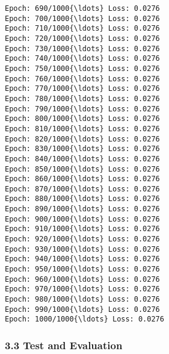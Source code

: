\documentclass[11pt]{article}
\begin{document}
\begin{Verbatim}[commandchars=\\\{\}]
Epoch: 690/1000{\ldots} Loss: 0.0276
Epoch: 700/1000{\ldots} Loss: 0.0276
Epoch: 710/1000{\ldots} Loss: 0.0276
Epoch: 720/1000{\ldots} Loss: 0.0276
Epoch: 730/1000{\ldots} Loss: 0.0276
Epoch: 740/1000{\ldots} Loss: 0.0276
Epoch: 750/1000{\ldots} Loss: 0.0276
Epoch: 760/1000{\ldots} Loss: 0.0276
Epoch: 770/1000{\ldots} Loss: 0.0276
Epoch: 780/1000{\ldots} Loss: 0.0276
Epoch: 790/1000{\ldots} Loss: 0.0276
Epoch: 800/1000{\ldots} Loss: 0.0276
Epoch: 810/1000{\ldots} Loss: 0.0276
Epoch: 820/1000{\ldots} Loss: 0.0276
Epoch: 830/1000{\ldots} Loss: 0.0276
Epoch: 840/1000{\ldots} Loss: 0.0276
Epoch: 850/1000{\ldots} Loss: 0.0276
Epoch: 860/1000{\ldots} Loss: 0.0276
Epoch: 870/1000{\ldots} Loss: 0.0276
Epoch: 880/1000{\ldots} Loss: 0.0276
Epoch: 890/1000{\ldots} Loss: 0.0276
Epoch: 900/1000{\ldots} Loss: 0.0276
Epoch: 910/1000{\ldots} Loss: 0.0276
Epoch: 920/1000{\ldots} Loss: 0.0276
Epoch: 930/1000{\ldots} Loss: 0.0276
Epoch: 940/1000{\ldots} Loss: 0.0276
Epoch: 950/1000{\ldots} Loss: 0.0276
Epoch: 960/1000{\ldots} Loss: 0.0276
Epoch: 970/1000{\ldots} Loss: 0.0276
Epoch: 980/1000{\ldots} Loss: 0.0276
Epoch: 990/1000{\ldots} Loss: 0.0276
Epoch: 1000/1000{\ldots} Loss: 0.0276

    \end{Verbatim}

    \subsubsection{3.3 Test and Evaluation}\label{test-and-evaluation}
\end{document}
